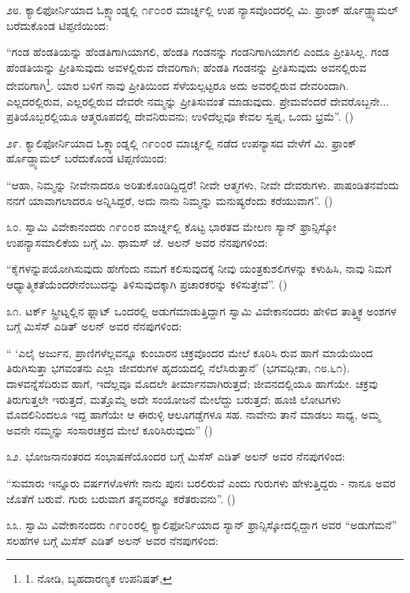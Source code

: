 ೨೮. ಕ್ಯಾಲಿಫೋರ್ನಿಯಾದ ಓಕ್ಲ್ಯಾಂಡ್ನಲ್ಲಿ ೧೯೦೦ರ ಮಾರ್ಚ್ನಲ್ಲಿ ಉಪ ನ್ಯಾಸವೊಂದರಲ್ಲಿ ಮಿ. ಫ್ರಾಂಕ್ ರ್ಹೊಡ್ಹ್ಯಾಮಲ್ ಬರೆದುಕೊಂಡ ಟಿಪ್ಪಣಿಯಿಂದ:

“ಗಂಡ ಹೆಂಡತಿಯನ್ನು ಹೆಂಡತಿಗಾಗಿಯಾಗಲಿ, ಹೆಂಡತಿ ಗಂಡನನ್ನು ಗಂಡನಿಗಾಗಿಯಾಗಲಿ ಎಂದೂ ಪ್ರೀತಿಸಿಲ್ಲ. ಗಂಡ ಹೆಂಡತಿಯನ್ನು ಪ್ರೀತಿಸುವುದು ಅವಳಲ್ಲಿರುವ ದೇವರಿಗಾಗಿ; ಹೆಂಡತಿ ಗಂಡನನ್ನು ಪ್ರೀತಿಸುವುದು ಅವನಲ್ಲಿರುವ ದೇವರಿಗಾಗಿ\footnote{1. ನೋಡಿ, ಬೃಹದಾರಣ್ಯಕ ಉಪನಿಷತ್, }. ಯಾರ ಬಳಿಗೆ ನಾವು ಪ್ರೀತಿಯಿಂದ ಸೆಳೆಯಲ್ಪಟ್ಟರೂ ಅದು ಅವರಲ್ಲಿರುವ ದೇವರಿಂದಾಗಿ. ಎಲ್ಲದರಲ್ಲಿರುವ, ಎಲ್ಲರಲ್ಲಿರುವ ದೇವರೇ ನಮ್ಮನ್ನು ಪ್ರೀತಿಸುವಂತೆ ಮಾಡುವುದು. ಪ್ರೇಮವೆಂದರೆ ದೇವರೊಬ್ಬನೇ... ಪ್ರತಿಯೊಬ್ಬರಲ್ಲಿಯೂ ಆತ್ಮರೂಪದಲ್ಲಿ ದೇವನಿರುವನು; ಉಳಿದೆಲ್ಲವೂ ಕೇವಲ ಸ್ವಪ್ನ, ಒಂದು ಭ್ರಮೆ”. ()

೨೯. ಕ್ಯಾಲಿಫೋರ್ನಿಯಾದ ಓಕ್ಲ್ಯಾಂಡ್ನಲ್ಲಿ ೧೯೦೦ರ ಮಾರ್ಚ್ನಲ್ಲಿ ನಡೆದ ಉಪನ್ಯಾಸದ ವೇಳೆಗೆ ಮಿ. ಫ್ರಾಂಕ್ ರ್ಹೊಡ್ಹ್ಯಾಮಲ್ ಬರೆದುಕೊಂಡ ಟಿಪ್ಪಣಿಯಿಂದ:

“ಆಹಾ, ನಿಮ್ಮನ್ನು ನೀವೇನಾದರೂ ಅರಿತುಕೊಂಡಿದ್ದಿದ್ದರೆ! ನೀವೇ ಆತ್ಮಗಳು, ನೀವೇ ದೇವರುಗಳು. ಪಾಷಂಡಿತನವೆಂದು ನನಗೆ ಯಾವಾಗಲಾದರೂ ಅನ್ನಿಸಿದ್ದರೆ, ಅದು ನಾನು ನಿಮ್ಮನ್ನು ಮನುಷ್ಯರೆಂದು ಕರೆಯುವಾಗ”. ()

೩೦. ಸ್ವಾಮಿ ವಿವೇಕಾನಂದರು ೧೯೦೦ರ ಮಾರ್ಚ್ನಲ್ಲಿ ಕೊಟ್ಟ ಭಾರತದ ಮೇಲಣ ಸ್ಯಾನ್ ಫ್ರಾನ್ಸಿಸ್ಕೋ ಉಪನ್ಯಾಸಮಾಲಿಕೆಯ ಬಗ್ಗೆ ಮಿ. ಥಾಮಸ್ ಜೆ. ಅಲನ್ ಅವರ ನೆನಪುಗಳಿಂದ:

“ಕೈಗಳನ್ನುಪಯೋಗಿಸುವುದು ಹೇಗೆಂದು ನಮಗೆ ಕಲಿಸುವುದಕ್ಕೆ ನೀವು ಯಂತ್ರಕುಶಲಿಗಳನ್ನು ಕಳುಹಿಸಿ, ನಾವು ನಿಮಗೆ ಆಧ್ಯಾತ್ಮಿಕತೆಯೆಂದರೇನೆಂಬುದನ್ನು ತಿಳಿಸುವುದಕ್ಕಾಗಿ ಪ್ರಚಾರಕರನ್ನು ಕಳಿಸುತ್ತೇವೆ”. ()

೩೧. ಟರ್ಕ್ ಸ್ಟ್ರೀಟ್ನಲ್ಲಿನ ಫ್ಲಾಟ್ ಒಂದರಲ್ಲಿ ಅಡುಗೆಮಾಡುತ್ತಿದ್ದಾಗ ಸ್ವಾಮಿ ವಿವೇಕಾನಂದರು ಹೇಳಿದ ತಾತ್ತ್ವಿಕ ಅಂಶಗಳ ಬಗ್ಗೆ ಮಿಸೆಸ್ ಎಡಿತ್ ಅಲನ್ ಅವರ ನೆನಪುಗಳಿಂದ:

“ ‘ಎಲೈ ಅರ್ಜುನ, ಪ್ರಾಣಿಗಳೆಲ್ಲವನ್ನೂ ಕುಂಬಾರನ ಚಕ್ರವೊಂದರ ಮೇಲೆ ಕೂರಿಸಿ ರುವ ಹಾಗೆ ಮಾಯೆಯಿಂದ ತಿರುಗಿಸುತ್ತಾ ಭಗವಂತನು ಎಲ್ಲಾ ಜೀವರುಗಳ ಹೃದಯದಲ್ಲಿ ನೆಲೆಸಿರುತ್ತಾನೆ’ (ಭಗವದ್ಗೀತಾ, ೧೮.೬೧). ದಾಳವನ್ನೆಸೆದಿರುವ ಹಾಗೆ, ಇದೆಲ್ಲವೂ ಮೊದಲೇ ತೀರ್ಮಾನವಾಗಿರುತ್ತದೆ; ಜೀವನದಲ್ಲಿಯೂ ಹಾಗೆಯೇ. ಚಕ್ರವು ತಿರುಗುತ್ತಲೇ ಇರುತ್ತದೆ, ಮತ್ತೊಮ್ಮೆ ಅದೇ ಸಂಯೋಜನೆ ಮೇಲೆದ್ದು ಬರುತ್ತದೆ; ಹೂಜಿ ಲೋಟಗಳು ಮೊದಲಿನಿಂದಲೂ ಇದ್ದ ಹಾಗೆಯೇ ಆ ಈರುಳ್ಳಿ ಆಲೂಗಡ್ಡೆಗಳೂ ಸಹ. ನಾವೇನು ತಾನೆ ಮಾಡಲು ಸಾಧ್ಯ, ಅಮ್ಮ ಅವನೇ ನಮ್ಮನ್ನು ಸಂಸಾರಚಕ್ರದ ಮೇಲೆ ಕೂರಿಸಿರುವುದು” ()

೩೨. ಭೋಜನಾನಂತರದ ಸಂಭಾಷಣೆಯೊಂದರ ಬಗ್ಗೆ ಮಿಸೆಸ್ ಎಡಿತ್ ಅಲನ್ ಅವರ ನೆನಪುಗಳಿಂದ:

“ಸುಮಾರು ಇನ್ನೂರು ವರ್ಷಗಳೊಳಗೇ ನಾನು ಪುನಃ ಬರಲಿರುವೆ ಎಂದು ಗುರುಗಳು ಹೇಳುತ್ತಿದ್ದರು - ನಾನೂ ಅವರ ಜೊತೆಗೆ ಬರುವೆ. ಗುರು ಬರುವಾಗ ತನ್ನವರನ್ನೂ ಕರೆತರುವನು”. ()

೩೩. ಸ್ವಾಮಿ ವಿವೇಕಾನಂದರು ೧೯೦೦ರಲ್ಲಿ ಕ್ಯಾಲಿಫೋರ್ನಿಯಾದ ಸ್ಯಾನ್ ಫ್ರಾನ್ಸಿಸ್ಕೋದಲ್ಲಿದ್ದಾಗ ಅವರ “ಅಡುಗೆಮನೆ” ಸಲಹೆಗಳ ಬಗ್ಗೆ ಮಿಸೆಸ್ ಎಡಿತ್ ಅಲನ್ ಅವರ ನೆನಪುಗಳಿಂದ:

